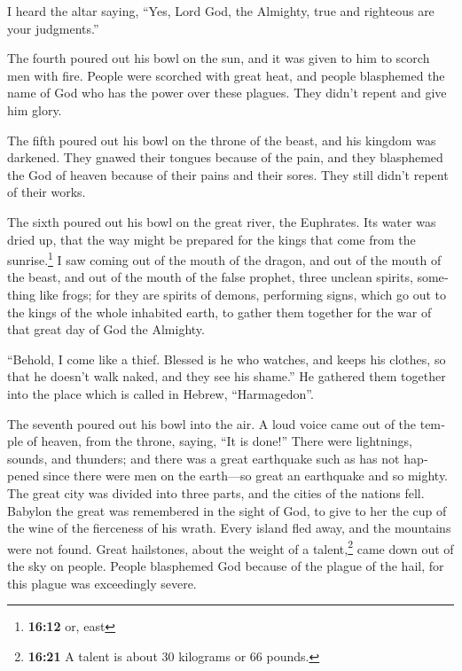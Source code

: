 \begin{paracol}{2}
\begin{otherlanguage}{english}
 I heard the altar saying, ``Yes, Lord God, the Almighty,
true and righteous are your judgments.''

 The fourth poured out his bowl on the sun, and it was
given to him to scorch men with fire.  People were
scorched with great heat, and people blasphemed the name of God who has
the power over these plagues. They didn't repent and give him glory.

 The fifth poured out his bowl on the throne of the
beast, and his kingdom was darkened. They gnawed their tongues because
of the pain,  and they blasphemed the God of heaven
because of their pains and their sores. They still didn't repent of
their works.

 The sixth poured out his bowl on the great river, the
Euphrates. Its water was dried up, that the way might be prepared for
the kings that come from the sunrise.\footnote{\textbf{16:12} or, east}
 I saw coming out of the mouth of the dragon, and out of
the mouth of the beast, and out of the mouth of the false prophet, three
unclean spirits, something like frogs;  for they are
spirits of demons, performing signs, which go out to the kings of the
whole inhabited earth, to gather them together for the war of that great
day of God the Almighty.

 ``Behold, I come like a thief. Blessed is he who
watches, and keeps his clothes, so that he doesn't walk naked, and they
see his shame.''  He gathered them together into the
place which is called in Hebrew, ``Harmagedon''.

 The seventh poured out his bowl into the air. A loud
voice came out of the temple of heaven, from the throne, saying, ``It is
done!''  There were lightnings, sounds, and thunders; and
there was a great earthquake such as has not happened since there were
men on the earth---so great an earthquake and so mighty. 
The great city was divided into three parts, and the cities of the
nations fell. Babylon the great was remembered in the sight of God, to
give to her the cup of the wine of the fierceness of his wrath.
 Every island fled away, and the mountains were not
found.  Great hailstones, about the weight of a
talent,\footnote{\textbf{16:21} A talent is about 30 kilograms or 66
  pounds.} came down out of the sky on people. People blasphemed God
because of the plague of the hail, for this plague was exceedingly
severe.


\end{otherlanguage}
\end{paracol}
